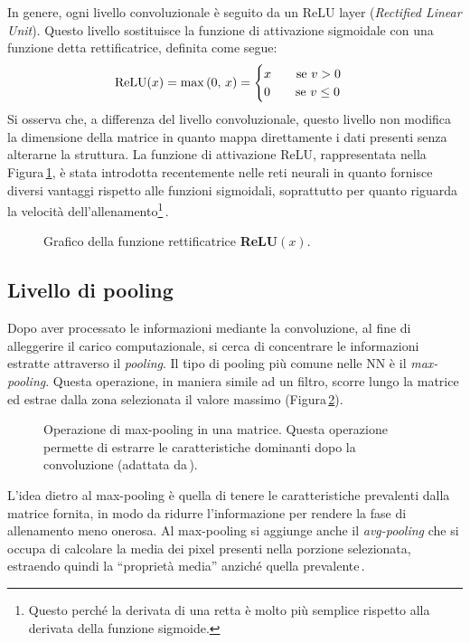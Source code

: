In genere, ogni livello convoluzionale è seguito da un \acs{ReLU} layer (\textit{Rectified Linear Unit}). Questo livello sostituisce la funzione di attivazione sigmoidale con una funzione detta rettificatrice, definita come segue:
% 
\begin{gather*}
    \text{ReLU}(x) = \max{\left(0,\,x\right)} = 
    \begin{cases}
        x \hspace{20px} \text{se } v>0\\
        0 \hspace{20px} \text{se } v\leq0
    \end{cases}
\end{gather*}
% 
\noindent Si osserva che, a differenza del livello convoluzionale, questo livello non modifica la dimensione della matrice in quanto mappa direttamente i dati presenti senza alterarne la struttura. La funzione di attivazione \acs{ReLU}, rappresentata nella Figura\,\ref{fig:relu-function}, è stata introdotta recentemente nelle reti neurali in quanto fornisce diversi vantaggi rispetto alle funzioni sigmoidali, soprattutto per quanto riguarda la velocità dell'allenamento\footnote{Questo perché la derivata di una retta è molto più semplice rispetto alla derivata della funzione sigmoide.}\,\cite{aggarwal2018neural}.
% 
\begin{figure}[!t]
    \centering
    
    \caption[Grafico della funzione rettificatrice \textsl{ReLU}$(x)$.]{Grafico della funzione rettificatrice \textbf{ReLU}$(x)$.}\label{fig:relu-function}
\end{figure}

\subsection{Livello di pooling}

Dopo aver processato le informazioni mediante la convoluzione, al fine di alleggerire il carico computazionale, si cerca di concentrare le informazioni estratte attraverso il \textit{pooling}. Il tipo di pooling più comune nelle \acs{NN} è il \textit{max-pooling}. Questa operazione, in maniera simile ad un filtro, scorre lungo la matrice ed estrae dalla zona selezionata il valore massimo (Figura\,\ref{fig:max-pooling-operation}).
% 
\begin{figure}[!b]
    \centering
    
    \caption[Operazione di max-pooling in una matrice.]{Operazione di max-pooling in una matrice. Questa operazione permette di estrarre le caratteristiche dominanti dopo la convoluzione (adattata da\,\cite{janosh_convolution}).}\label{fig:max-pooling-operation}
\end{figure}
% 
L'idea dietro al max-pooling è quella di tenere le caratteristiche prevalenti dalla matrice fornita, in modo da ridurre l'informazione per rendere la fase di allenamento meno onerosa. Al max-pooling si aggiunge anche il \textit{avg-pooling} che si occupa di calcolare la media dei pixel presenti nella porzione selezionata, estraendo quindi la ``proprietà media'' anziché quella prevalente\,\cite{aggarwal2018neural, o2015introduction}.

